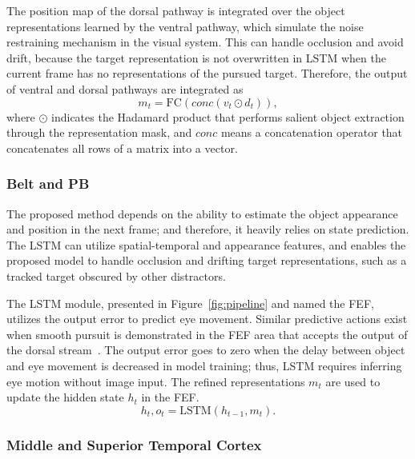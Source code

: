 \documentclass[journal]{IEEEtran}
\begin{document}
The position map of the dorsal pathway is integrated over the object representations learned by the ventral pathway, which simulate the noise restraining mechanism in the visual system. 
This can handle occlusion and avoid drift, because the target representation is not overwritten in LSTM when the current frame has no representations of the pursued target. 
Therefore, the output of ventral and dorsal pathways are integrated as
\begin{equation}
	m_t = \text{FC}(conc(v_t \odot d_t)),
\end{equation}
where $\odot$ indicates the Hadamard product that performs salient object extraction through the representation mask, 
and $conc$ means a concatenation operator that concatenates all rows of a matrix into a vector.

\subsubsection{Belt and PB}

The proposed method depends on the ability to estimate the object appearance and position in the next frame; 
and therefore, it heavily relies on state prediction. 
The LSTM can utilize spatial-temporal and appearance features, 
and enables the proposed model to handle occlusion and drifting target representations, such as a tracked target obscured by other distractors. 

The LSTM module, presented in Figure~\ref{fig:pipeline} and named the FEF, utilizes the output error to predict eye movement. 
Similar predictive actions exist when smooth pursuit is demonstrated in the FEF area that accepts the output of the dorsal stream~\cite{b11,b13,b14}. 
The output error goes to zero when the delay between object and eye movement is decreased in model training; 
thus, LSTM requires inferring eye motion without image input.
The refined representations $m_t$ are used to update the hidden state $h_t$ in the FEF. 
\begin{equation} \label{LSTM}
	h_t, o_t = \text{LSTM}(h_{t-1}, m_t).
\end{equation}



\subsubsection{Middle and Superior Temporal Cortex}
\end{document}

